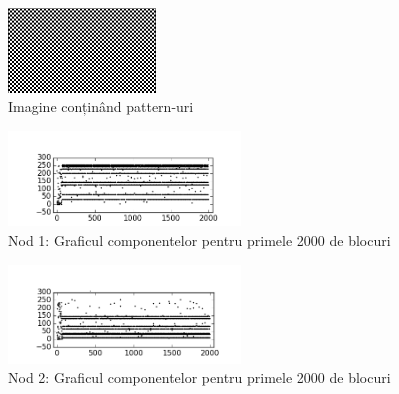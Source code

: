 \documentclass[oneside, 12pt]{book}
\begin{document}
\begin{figure}[H]
\begin{center}
\includegraphics[width=0.35\textwidth]{img/carouri.png}    %
\caption{Imagine conținând pattern-uri} 
\label{fig:carouri}
\end{center}
\end{figure}


\begin{figure}[t!]
\begin{center}
\includegraphics[width=0.55\textwidth]{img/carouri_db1.png}    %
\caption{Nod 1: Graficul componentelor pentru primele 2000 de blocuri} 
\label{fig:carouri_db1}
\end{center}
\end{figure}

\begin{figure}[t!]
\begin{center}
\includegraphics[width=0.55\textwidth]{img/carouri_db2.png}    %
\caption{Nod 2: Graficul componentelor pentru primele 2000 de blocuri} 
\label{fig:carouri_db2}
\end{center}
\end{figure}
\end{document}
